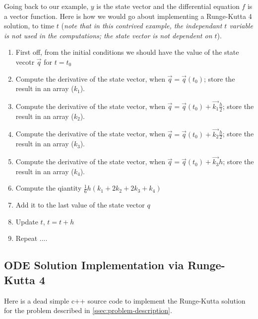 \documentclass[12pt,a4paper,twoside]{report}
\begin{document}
Going back to our example, \( y \) is the state vector and the differential equation 
\( f \) is a vector function. Here is how we would go about implementing a 
Runge-Kutta 4 solution, to time \( t \) (\textit{note that in this contrived example, 
the independant \( t \) variable is not used in the computations; the state vector 
is not dependent on \(t\)}).
\begin{enumerate}
  \item First off, from the initial conditions we should have the value of the state vecotr \( \vec{q} \) for \( t = t_0 \)
  \item Compute the derivative of the state vector, when \( \vec{q} = \vec{q}(t_0) \); 
  store the result in an array (\( k_1 \)).
  \item Compute the derivative of the state vector, when \( \vec{q} = \vec{q}(t_0)+\vec{k_1} \frac{h}{2} \); store the result in an array (\( k_2 \)).
  \item Compute the derivative of the state vector, when \( \vec{q} = \vec{q}(t_0)+\vec{k_2} \frac{h}{2} \); store the result in an array (\( k_3 \)).
  \item Compute the derivative of the state vector, when \( \vec{q} = \vec{q}(t_0)+\vec{k_3} h \); store the result in an array (\( k_4 \)).
  \item Compute the qiantity \( \frac{1}{6} h (k_1 + 2 k_2 + 2 k_3 + k_4) \)
  \item Add it to the last value of the state vector \( q \)
  \item Update \( t \), \( t = t + h \)
  \item Repeat  ....
\end{enumerate}

\subsection{ODE Solution Implementation via Runge-Kutta 4}
Here is a dead simple c++ source code to implement the Runge-Kutta solution for the 
problem described in \ref{ssec:problem-description}.



\end{document}
